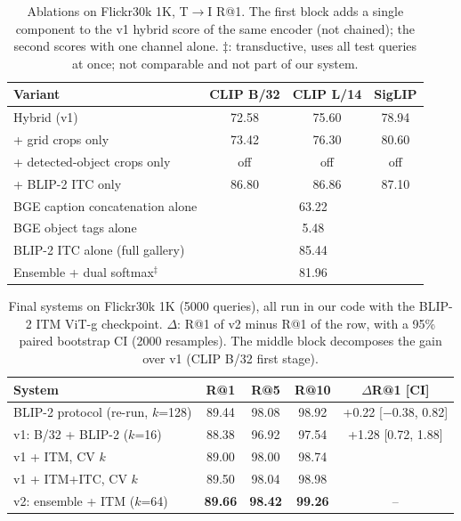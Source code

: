 \documentclass[conference]{IEEEtran}
\newcommand{\RA}{\ensuremath{\rightarrow}}
\newcommand{\best}[1]{\textbf{#1}}
\begin{document}
\begin{table}[t]
\centering
\caption{Ablations on Flickr30k 1K, T\RA I R@1. The first block adds a single component to the v1 hybrid score of
the same encoder (not chained); the second scores with one channel alone. $\ddagger$: transductive, uses all test
queries at once; not comparable and not part of our system.}
\label{tab:v2abl}
\setlength{\tabcolsep}{4pt}
\begin{tabular}{lccc}
\toprule
Variant & CLIP B/32 & CLIP L/14 & SigLIP \\
\midrule
Hybrid (v1)                         & 72.58 & 75.60 & 78.94 \\
+ grid crops only                   & 73.42 & 76.30 & 80.60 \\
+ detected-object crops only        & off   & off   & off   \\
+ BLIP-2 ITC only                   & 86.80 & 86.86 & 87.10 \\
\midrule
BGE caption concatenation alone     & \multicolumn{3}{c}{63.22} \\
BGE object tags alone               & \multicolumn{3}{c}{5.48} \\
BLIP-2 ITC alone (full gallery)     & \multicolumn{3}{c}{85.44} \\
Ensemble + dual softmax$^\ddagger$  & \multicolumn{3}{c}{81.96} \\
\bottomrule
\end{tabular}
\end{table}

\begin{table}[t]
\centering
\caption{Final systems on Flickr30k 1K (5000 queries), all run in our code with the BLIP-2 ITM ViT-g checkpoint.
$\Delta$: R@1 of v2 minus R@1 of the row, with a 95\% paired bootstrap CI (2000 resamples). The middle block
decomposes the gain over v1 (CLIP B/32 first stage).}
\label{tab:v2final}
\setlength{\tabcolsep}{2.2pt}
\begin{tabular}{l ccc c}
\toprule
System & R@1 & R@5 & R@10 & $\Delta$R@1 [CI] \\
\midrule
BLIP-2 protocol (re-run, $k$=128) & 89.44 & 98.08 & 98.92 & +0.22 [$-$0.38, 0.82] \\
v1: B/32 + BLIP-2 ($k$=16)       & 88.38 & 96.92 & 97.54 & +1.28 [0.72, 1.88] \\
\midrule
v1 + ITM, CV $k$                 & 89.00 & 98.00 & 98.74 & \\
v1 + ITM+ITC, CV $k$             & 89.50 & 98.04 & 98.98 & \\
\midrule
v2: ensemble + ITM ($k$=64)      & \best{89.66} & \best{98.42} & \best{99.26} & -- \\
\bottomrule
\end{tabular}
\end{table}
\end{document}
